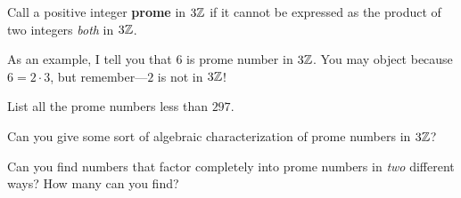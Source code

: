 \documentclass{ximera}
\begin{document}
\begin{definition}
Call a positive integer \textbf{prome} in $3\mathbb Z$ if it cannot be
expressed as the product of two integers \textit{both} in $3\mathbb Z$.
\end{definition}

As an example, I tell you that $6$ is prome number in $3\mathbb Z$. You may
object because $6 = 2\cdot 3$, but remember---$2$ is not in $3\mathbb Z$!


\begin{question}
List all the prome numbers less than $297$.
\end{question}

\begin{question}
Can you give some sort of algebraic characterization of prome numbers
in $3\mathbb Z$? 
\end{question}

\begin{question}
Can you find numbers that factor completely into prome numbers in
\textit{two} different ways? How many can you find?
\end{question}
\end{document}
